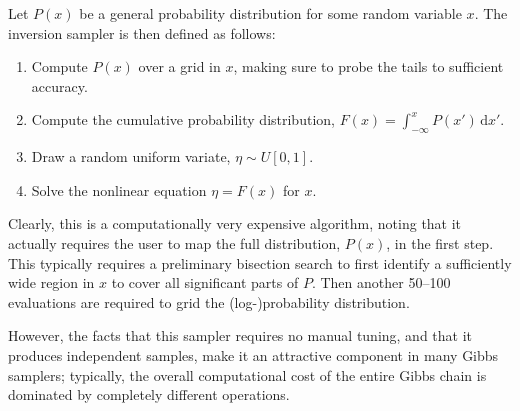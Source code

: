 \documentclass[twocolumn]{aa}
\newcommand{\B}[0]{\tens{B}}
\newcommand{\M}[0]{\tens{M}}
\renewcommand{\P}[0]{\tens{P}}
\newcommand{\Dbp}[0]{\Delta_{\mathrm{bp}}}
\begin{document}
Let $P(x)$ be a general probability distribution for some random
variable $x$. The inversion sampler is then defined as follows:
\begin{enumerate}
  \item Compute $P(x)$ over a grid in $x$, making sure to probe the
    tails to sufficient accuracy.
  \item Compute the cumulative probability distribution, ${F(x) =
    \int_{-\infty}^{x} P(x')\,\mathrm dx'}$.
  \item Draw a random uniform variate, $\eta \sim U[0,1]$.
  \item Solve the nonlinear equation $\eta = F(x)$ for $x$.
\end{enumerate}

Clearly, this is a computationally very expensive algorithm, noting
that it actually requires the user to map the full distribution,
$P(x)$, in the first step. This typically requires a preliminary
bisection search to first identify a sufficiently wide region in $x$
to cover all significant parts of $P$. Then another 50--100
evaluations are required to grid the (log-)probability
distribution. 

However, the facts that this sampler requires no manual tuning, and
that it produces independent samples, make it an attractive component
in many Gibbs samplers; typically, the overall computational cost of
the entire Gibbs chain is dominated by completely different operations.




\end{document}
